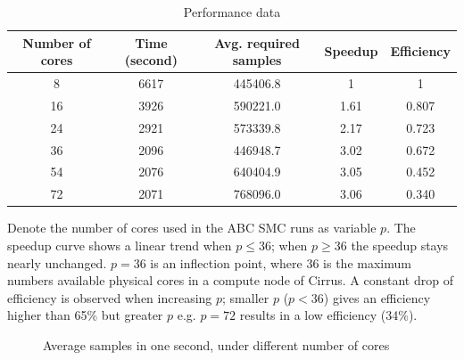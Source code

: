 \begin{table}[H]
    \centering
    \begin{tabular}{|c c c c c|}
        \hline
        Number of cores & Time (second) & Avg. required samples & Speedup & Efficiency \\ [0.5ex]
        \hline\hline
        8               & 6617          & 445406.8              & 1       & 1          \\
        16              & 3926          & 590221.0              & 1.61    & 0.807      \\
        24              & 2921          & 573339.8              & 2.17    & 0.723      \\
        36              & 2096          & 446948.7              & 3.02    & 0.672      \\
        54              & 2076          & 640404.9              & 3.05    & 0.452      \\
        72              & 2071          & 768096.0              & 3.06    & 0.340      \\
        \hline
    \end{tabular}
    \caption{Performance data}
    \label{table:performance}
\end{table}

Denote the number of cores used in the ABC SMC runs as variable $p$. The speedup curve shows a linear trend when $p\leq 36$; when $p\geq 36$ the speedup stays nearly unchanged. $p=36$ is an inflection point, where 36 is the maximum numbers available physical cores in a compute node of Cirrus. A constant drop of efficiency is observed when increasing $p$; smaller $p$ ($p<36$) gives an efficiency higher than 65\% but greater $p$ e.g. $p=72$ results in a low efficiency (34\%).

\begin{figure}[h]
    \begin{center}
    \end{center}

    \caption[Average samples in a second, under different number of cores]{Average samples in one second, under different number of cores}
    \label{fig:sample_per_sec}
\end{figure}

